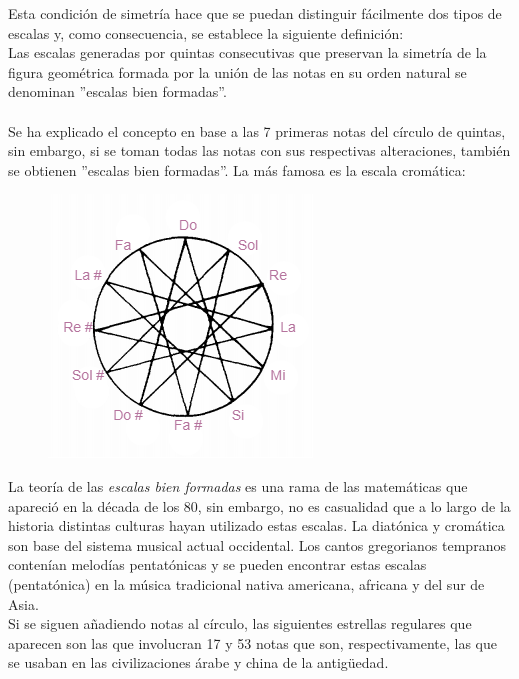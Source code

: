 \documentclass[a4paper, openright, 11pt, titlepage]{report}
\theoremstyle{definition}\newtheorem{defin}[propo]{Definition}
\theoremstyle{definition}\newtheorem{obser}[propo]{Remark}
\theoremstyle{definition}\newtheorem{ejem}[propo]{Ejemplo}
\theoremstyle{definition}\newtheorem{algoritmo}[propo]{Algoritmo}
\begin{document}
Esta condición de simetría hace que se puedan distinguir fácilmente dos tipos de escalas y, como consecuencia, se establece la siguiente definición:\\
Las escalas generadas por quintas consecutivas que preservan la simetría de la figura geométrica formada por la unión de las notas en su orden natural se denominan ''escalas bien formadas''.\\\\
Se ha explicado el concepto en base a las 7 primeras notas del círculo de quintas, sin embargo, si se toman todas las notas con sus respectivas alteraciones, también se obtienen ''escalas bien formadas''. La más famosa es la escala cromática: 
\begin{figure}[H]
    \centering
    \includegraphics[scale = 0.7]{circuloCromatica.png}
\end{figure}
La teoría de las \textit{escalas bien formadas} es una rama de las matemáticas que apareció en la década de los 80, sin embargo, no es casualidad que a lo largo de la historia distintas culturas hayan utilizado estas escalas. La diatónica y cromática son base del sistema musical actual occidental. Los cantos gregorianos tempranos contenían melodías pentatónicas y se pueden encontrar estas escalas (pentatónica) en la música tradicional nativa americana, africana y del sur de Asia.\\
Si se siguen añadiendo notas al círculo, las siguientes estrellas regulares que aparecen son las que involucran 17 y 53 notas que son, respectivamente, las que se usaban en las civilizaciones árabe y china de la antigüedad.
\end{document}
